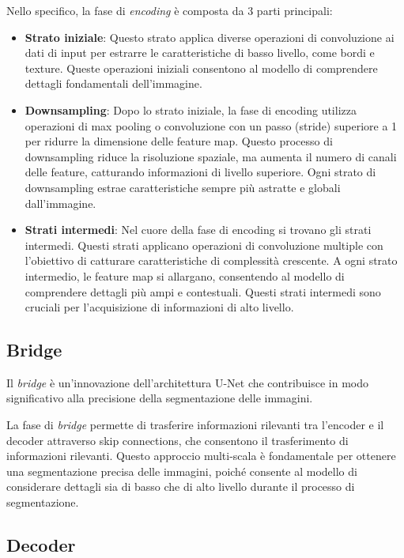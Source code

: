 Nello specifico, la fase di \textit{encoding} è composta da 3 parti principali:
\begin{itemize}
  \item \textbf{Strato iniziale}: Questo strato applica diverse operazioni di convoluzione ai dati di input per estrarre le caratteristiche di basso livello, come bordi e texture. Queste operazioni iniziali consentono al modello di comprendere dettagli fondamentali dell'immagine.
  \item \textbf{Downsampling}: Dopo lo strato iniziale, la fase di encoding utilizza operazioni di max pooling o convoluzione con un passo (stride) superiore a 1 per ridurre la dimensione delle feature map. Questo processo di downsampling riduce la risoluzione spaziale, ma aumenta il numero di canali delle feature, catturando informazioni di livello superiore. Ogni strato di downsampling estrae caratteristiche sempre più astratte e globali dall'immagine.
  \item \textbf{Strati intermedi}: Nel cuore della fase di encoding si trovano gli strati intermedi. Questi strati applicano operazioni di convoluzione multiple con l'obiettivo di catturare caratteristiche di complessità crescente. A ogni strato intermedio, le feature map si allargano, consentendo al modello di comprendere dettagli più ampi e contestuali. Questi strati intermedi sono cruciali per l'acquisizione di informazioni di alto livello.
\end{itemize}



\subsection{Bridge} %
\label{sec:Bridge}
Il \textit{bridge} è un'innovazione dell'architettura U-Net che contribuisce in modo significativo alla precisione della segmentazione delle immagini.

La fase di \textit{bridge} permette di trasferire informazioni rilevanti tra l'encoder e il decoder attraverso skip connections, che consentono il trasferimento di informazioni rilevanti. Questo approccio multi-scala è fondamentale per ottenere una segmentazione precisa delle immagini, poiché consente al modello di considerare dettagli sia di basso che di alto livello durante il processo di segmentazione.




\subsection{Decoder} %
\label{sec:Decoder}

